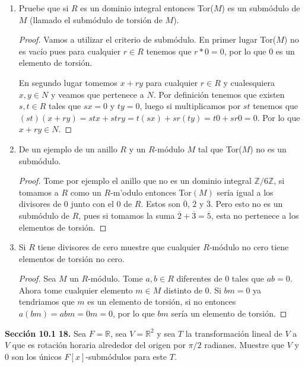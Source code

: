 \documentclass[letter,twoside,12pt]{article}
\begin{document}
\begin{enumerate}[label=\textbf{(\alph*)}]
\item Pruebe que si $ R $ es un dominio integral entonces Tor($ M $) es un submódulo de $ M $ (llamado el submódulo de torsión de $ M $).
\begin{proof}
Vamos a utilizar el criterio de submódulo. En primer lugar Tor($ M $) no es vacío pues para cualquier $ r \in R $ tenemos que $ r*0=0 $, por lo que 0 es un elemento de torsión.

En segundo lugar tomemos $ x+ry $ para cualquier $ r \in R $ y cualesquiera $ x,y \in N $ y veamos que pertenece a $ N $. Por definición tenemos que existen $ s,t \in R $ tales que $ sx=0 $ y $ ty=0 $, luego si multiplicamos por $ st $ tenemos que $ (st)(x+ry)=stx+stry=t(sx)+sr(ty)=t0+sr0=0 $. Por lo que $ x+ry \in N $.
\end{proof}
\item De un ejemplo de un anillo $ R $ y un $ R $-módulo $ M $ tal que Tor($ M $) no es un submódulo.
\begin{proof}
Tome por ejemplo el anillo que no es un dominio integral $ \mathbb{Z}/6\mathbb{Z} $, si tomamos a $ R $ como un $ R $-m'odulo entonces Tor$(M)$ sería igual a los divisores de 0 junto con el 0 de $ R $. Estos son $ \overline{0} $, $ \overline{2} $ y $ \overline{3} $. Pero esto no es un submódulo de $ R $, pues si tomamos la suma $ \overline{2} + \overline{3} = \overline{5}$, esta no pertenece a los elementos de torsión. 
\end{proof}
\item Si $ R $ tiene divisores de cero muestre que cualquier $ R $-módulo no cero tiene elementos de torsión no cero.
\begin{proof}
Sea $ M $ un $ R $-módulo. Tome $ a,b \in R$ diferentes de 0 tales que $ ab=0 $. Ahora tome cualquier elemento $ m \in M $ distinto de 0. Si $ bm = 0 $ ya tendriamos que $ m $ es un elemento de torsión, si no entonces $ a(bm)=abm = 0m = 0 $, por lo que $ bm $ sería un elemento de torsión.
\end{proof}
\end{enumerate}

\textbf{Sección 10.1} \textbf{18.} Sea $ F = \mathbb{R} $, sea $ V = \mathbb{R}^2 $ y sea $ T $ la transformación lineal de $ V $ a  $ V $ que es rotación horaria alrededor del origen por $ \pi/2 $ radianes. Muestre que $ V $ y 0 son los únicos $ F[x] $-submódulos para este $ T $.
\end{document}
